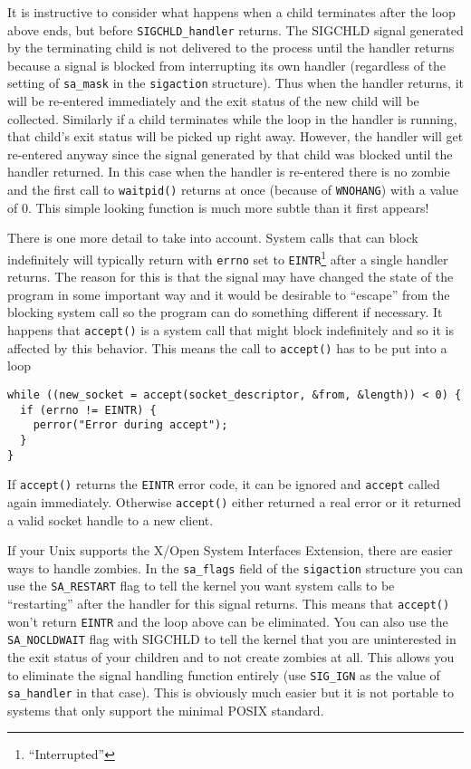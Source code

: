 \documentclass{article}
\begin{document}
It is instructive to consider what happens when a child terminates after the loop above ends, but before \texttt{SIGCHLD\_handler} returns. The SIGCHLD signal generated by the terminating child is not delivered to the process until the handler returns because a signal is blocked from interrupting its own handler (regardless of the setting of \texttt{sa\_mask} in the \texttt{sigaction} structure). Thus when the handler returns, it will be re-entered immediately and the exit status of the new child will be collected. Similarly if a child terminates while the loop in the handler is running, that child's exit status will be picked up right away. However, the handler will get re-entered anyway since the signal generated by that child was blocked until the handler returned. In this case when the handler is re-entered there is no zombie and the first call to \texttt{waitpid()} returns at once (because of \texttt{WNOHANG}) with a value of $0$. This simple looking function is much more subtle than it first appears!

There is one more detail to take into account. System calls that can block indefinitely will typically return with \texttt{errno} set to \texttt{EINTR}\footnote{``Interrupted''} after a single handler returns. The reason for this is that the signal may have changed the state of the program in some important way and it would be desirable to ``escape'' from the blocking system call so the program can do something different if necessary. It happens that \texttt{accept()} is a system call that might block indefinitely and so it is affected by this behavior. This means the call to \texttt{accept()} has to be put into a loop

\begin{verbatim}
while ((new_socket = accept(socket_descriptor, &from, &length)) < 0) {
  if (errno != EINTR) {
    perror("Error during accept");
  }
}
\end{verbatim}

If \texttt{accept()} returns the \texttt{EINTR} error code, it can be ignored and \texttt{accept} called again immediately. Otherwise \texttt{accept()} either returned a real error or it returned a valid socket handle to a new client.

If your Unix supports the X/Open System Interfaces Extension, there are easier ways to handle zombies. In the \texttt{sa\_flags} field of the \texttt{sigaction} structure you can use the \texttt{SA\_RESTART} flag to tell the kernel you want system calls to be ``restarting'' after the handler for this signal returns. This means that \texttt{accept()} won't return \texttt{EINTR} and the loop above can be eliminated. You can also use the \texttt{SA\_NOCLDWAIT} flag with SIGCHLD to tell the kernel that you are uninterested in the exit status of your children and to not create zombies at all. This allows you to eliminate the signal handling function entirely (use \texttt{SIG\_IGN} as the value of \texttt{sa\_handler} in that case). This is obviously much easier but it is not portable to systems that only support the minimal POSIX standard.
\end{document}
